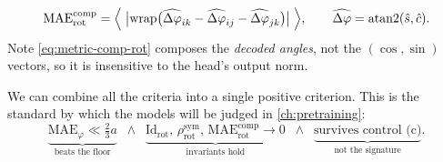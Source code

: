 \documentclass[final_report.tex]{subfiles}
\begin{document}
\begin{enumerate}
\begin{equation}\label{eq:metric-comp-rot}
  \mathrm{MAE}^{\mathrm{comp}}_{\mathrm{rot}}
  = \Bigl\langle\; \bigl|\operatorname{wrap}\bigl(\widehat{\Delta\varphi}_{ik} - \widehat{\Delta\varphi}_{ij} - \widehat{\Delta\varphi}_{jk}\bigr)\bigr| \;\Bigr\rangle,
  \qquad \widehat{\Delta\varphi} = \operatorname{atan2}(\hat s, \hat c).
\end{equation}
Note \cref{eq:metric-comp-rot} composes the \emph{decoded angles}, not the
$(\cos,\sin)$ vectors, so it is insensitive to the head's output norm.
\end{enumerate}

We can combine all the criteria into a single positive criterion. This is the standard by which the models will be judged in \cref{ch:pretraining}:
\begin{equation}\label{eq:positive-criterion}
  \underbrace{\mathrm{MAE}_\varphi \ll \tfrac{2}{3}a}_{\text{beats the floor}}
  \;\;\wedge\;\;
  \underbrace{\mathrm{Id}_{\mathrm{rot}},\, \rho^{\mathrm{sym}}_{\mathrm{rot}},\, \mathrm{MAE}^{\mathrm{comp}}_{\mathrm{rot}} \to 0}_{\text{invariants hold}}
  \;\;\wedge\;\;
  \underbrace{\text{survives control (c)}}_{\text{not the signature}} .
\end{equation}


\ifSubfilesClassLoaded{\pagebreak\printbibliography}{}
\end{document}
